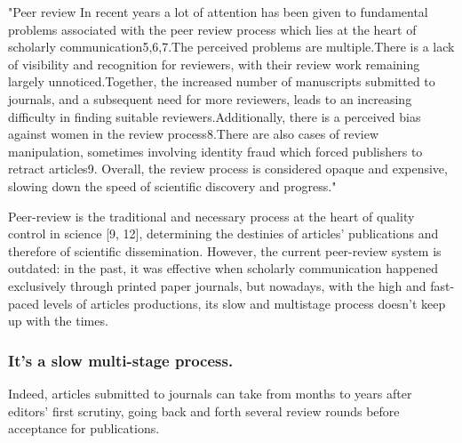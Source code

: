 \documentclass[runningheads]{llncs}
\begin{document}
"Peer review In recent years a lot of attention has been given to fundamental problems associated with the peer review process which lies at the heart of scholarly communication5,6,7.The perceived problems are multiple.There is a lack of visibility and recognition for reviewers, with their review work remaining largely unnoticed.Together, the increased number of manuscripts submitted to journals, and a subsequent need for more reviewers, leads to an increasing difficulty in finding suitable reviewers.Additionally, there is a perceived bias against women in the review process8.There are also cases of review manipulation, sometimes involving identity fraud which forced publishers to retract articles9. Overall, the review process is considered opaque and expensive, slowing down the speed of scientific discovery and progress."

Peer-review is the traditional and necessary process at the heart of quality control in science [9, 12], determining the destinies of articles’ publications and therefore of scientific dissemination. However, the current peer-review system is outdated: in the past, it was effective when scholarly communication happened exclusively through printed paper journals, but nowadays, with the high and fast-paced levels of articles productions, its slow and multistage process doesn’t keep up with the times.
\subsubsection{It's a slow multi-stage process.} Indeed, articles submitted to journals can take from months to years after editors’ first scrutiny, going back and forth several review rounds before acceptance for publications.
\end{document}
